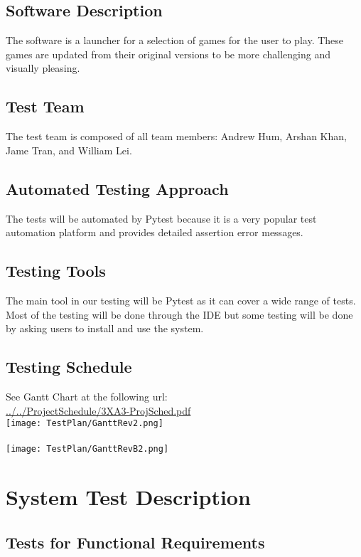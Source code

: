 \documentclass[12pt, titlepage]{article}
\begin{document}
\subsection{Software Description}

The software is a launcher for a selection of games for the user to play. These games are updated from their original versions to be more challenging and visually pleasing.

\subsection{Test Team}

The test team is composed of all team members: Andrew Hum, Arshan Khan, Jame Tran, and William Lei.

\subsection{Automated Testing Approach}

The tests will be automated by Pytest because it is a very popular test automation platform and provides detailed assertion error messages.

\subsection{Testing Tools}
The main tool in our testing will be Pytest as it can cover a wide range of tests. Most of the testing will be done through the IDE but some testing will be done by asking users to install and use the system.

\subsection{Testing Schedule}
		
See Gantt Chart at the following url: \\
\url{../../ProjectSchedule/3XA3-ProjSched.pdf}\\
\texttt{[image: TestPlan/GanttRev2.png]}\\
\\
\texttt{[image: TestPlan/GanttRevB2.png]}

\section{System Test Description}
	
\subsection{Tests for Functional Requirements}
\end{document}
